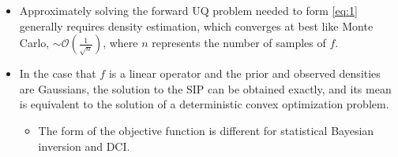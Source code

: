 \documentclass[11pt]{beamer}
\begin{document}
\begin{frame}

\begin{itemize}

	\item %
	Approximately solving the forward UQ problem needed to form \eqref{eq:1} generally requires density estimation, which converges at best like Monte Carlo,  $ \sim \mathcal{O}\left(\frac{1}{\sqrt{n}} \right)$, where $n$ represents the number of samples of $f$.
	
	\item In the case that $f$ is a linear operator and the prior and observed densities are Gaussians, the solution to the SIP can be obtained exactly, and its mean is equivalent to the solution of a deterministic convex optimization problem.
	
	\begin{itemize}
		\item The form of the objective function is different for statistical Bayesian inversion and DCI.
		
	\end{itemize}

\end{itemize}



\end{frame}
\end{document}
